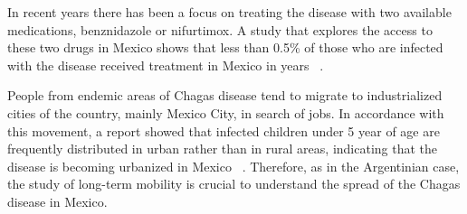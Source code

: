 In recent years there has been a focus on treating the disease with two available
medications, benznidazole or nifurtimox. A study
that explores the access to these two drugs in Mexico 
shows that less than 0.5\% of those who are infected with
the disease received treatment in Mexico in years~ \textcite{manne2013barriers}.


People from endemic areas of Chagas disease tend to migrate to industrialized cities of the country, mainly Mexico City, in search of jobs. 
In accordance with this movement, a report showed
that infected children under 5 year of age are frequently distributed in urban
rather than in rural areas, indicating that the disease is becoming urbanized in
Mexico~ \textcite{guzman2001epidemiology}.
Therefore, as in the Argentinian case, the study of long-term mobility is crucial to understand the spread of the Chagas disease in Mexico.






